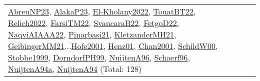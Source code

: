 {\begin{longtable}{p{3cm}r>{\raggedright\arraybackslash}p{6cm}>{\raggedright\arraybackslash}p{6cm}>{\raggedright\arraybackslash}p{8cm}}
\hyperref[detail:AbreuNP23]{AbreuNP23}, \hyperref[detail:AlakaP23]{AlakaP23}, \hyperref[detail:El-Kholany2022]{El-Kholany2022}, \hyperref[detail:TouatBT22]{TouatBT22}, \hyperref[detail:Relich2022]{Relich2022}, \hyperref[detail:FarsiTM22]{FarsiTM22}, \hyperref[detail:SvancaraB22]{SvancaraB22}, \hyperref[detail:FetgoD22]{FetgoD22}, \hyperref[detail:NaqviAIAAA22]{NaqviAIAAA22}, \hyperref[detail:Pinarbasi21]{Pinarbasi21}, \hyperref[detail:KletzanderMH21]{KletzanderMH21}, \hyperref[detail:GeibingerMM21]{GeibingerMM21}...\hyperref[detail:Hofe2001]{Hofe2001}, \hyperref[detail:Henz01]{Henz01}, \hyperref[detail:Chan2001]{Chan2001}, \hyperref[detail:SchildW00]{SchildW00}, \hyperref[detail:Stobbe1999]{Stobbe1999}, \hyperref[detail:DorndorfPH99]{DorndorfPH99}, \hyperref[detail:NuijtenA96]{NuijtenA96}, \hyperref[detail:Schaerf96]{Schaerf96}, \hyperref[detail:NuijtenA94a]{NuijtenA94a}, \hyperref[detail:NuijtenA94]{NuijtenA94} (Total: 128)\\
\end{longtable}
}

